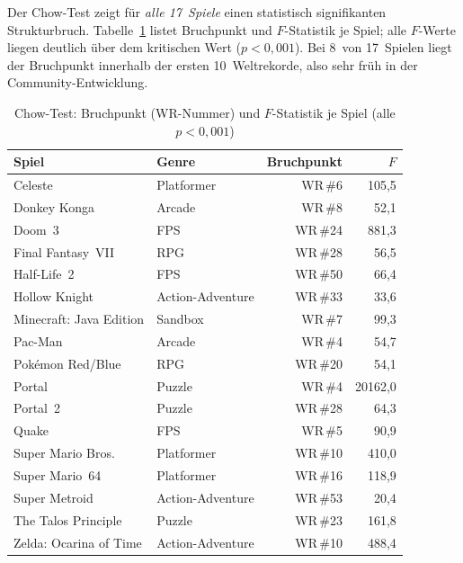 Der Chow-Test zeigt für \emph{alle 17~Spiele} einen statistisch signifikanten Strukturbruch. Tabelle~\ref{tab:chow} listet Bruchpunkt und $F$-Statistik je Spiel; alle $F$-Werte liegen deutlich über dem kritischen Wert ($p < 0{,}001$). Bei 8~von 17~Spielen liegt der Bruchpunkt innerhalb der ersten 10~Weltrekorde, also sehr früh in der Community-Entwicklung.

\begin{table}[htb]
  \centering
  \caption{Chow-Test: Bruchpunkt (WR-Nummer) und $F$-Statistik je Spiel (alle $p < 0{,}001$)}
  \label{tab:chow}
  \small
  \begin{tabular}{llrr}
    \toprule
    \textbf{Spiel} & \textbf{Genre} & \textbf{Bruchpunkt} & \textbf{$F$} \\
    \midrule
    Celeste                         & Platformer       & WR\,\#6  &    105,5 \\
    Donkey Konga                    & Arcade           & WR\,\#8  &     52,1 \\
    Doom~3                          & FPS              & WR\,\#24 &    881,3 \\
    Final Fantasy~VII               & RPG              & WR\,\#28 &     56,5 \\
    Half-Life~2                     & FPS              & WR\,\#50 &     66,4 \\
    Hollow Knight                   & Action-Adventure & WR\,\#33 &     33,6 \\
    Minecraft: Java Edition         & Sandbox          & WR\,\#7  &     99,3 \\
    Pac-Man                         & Arcade           & WR\,\#4  &     54,7 \\
    Pokémon Red/Blue                & RPG              & WR\,\#20 &     54,1 \\
    Portal                          & Puzzle           & WR\,\#4  & 20162,0  \\
    Portal~2                        & Puzzle           & WR\,\#28 &     64,3 \\
    Quake                           & FPS              & WR\,\#5  &     90,9 \\
    Super Mario Bros.               & Platformer       & WR\,\#10 &    410,0 \\
    Super Mario~64                  & Platformer       & WR\,\#16 &    118,9 \\
    Super Metroid                   & Action-Adventure & WR\,\#53 &     20,4 \\
    The Talos Principle             & Puzzle           & WR\,\#23 &    161,8 \\
    Zelda: Ocarina of Time          & Action-Adventure & WR\,\#10 &    488,4 \\
    \bottomrule
  \end{tabular}
\end{table}

